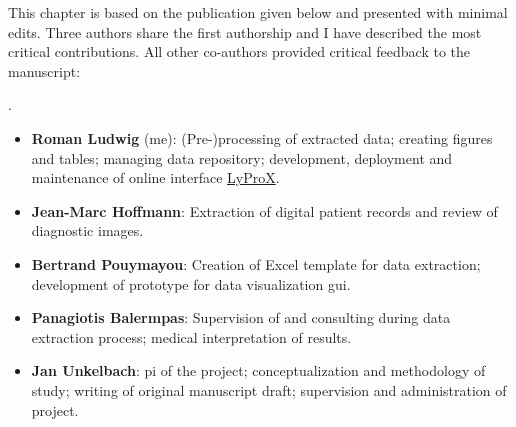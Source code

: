 \begin{tcolorbox}[
    title=\faIcon{users} Contributions,
    parbox=false,
]
    This chapter is based on the publication given below and presented with minimal edits. Three authors share the first authorship and I have described the most critical contributions. All other co-authors provided critical feedback to the manuscript:
    
    .

    \begin{itemize}[leftmargin=5.5mm]
        \item[\faIcon{user}] \textbf{Roman Ludwig} (me): (Pre-)processing of extracted data; creating figures and tables; managing data repository; development, deployment and maintenance of online interface \href{https://lyprox.org}{ LyProX}.
        \item[\faIcon{user}] \textbf{Jean-Marc Hoffmann}: Extraction of digital patient records and review of diagnostic images.
        \item[\faIcon{user}] \textbf{Bertrand Pouymayou}: Creation of Excel template for data extraction; development of prototype for data visualization \acrshort{gui}.
        \item[\faIcon{user}] \textbf{Panagiotis Balermpas}: Supervision of and consulting during data extraction process; medical interpretation of results.
        \item[\faIcon{user}] \textbf{Jan Unkelbach}: \Gls{pi} of the project; conceptualization and methodology of study; writing of original manuscript draft; supervision and administration of project.
    \end{itemize}
\end{tcolorbox}
